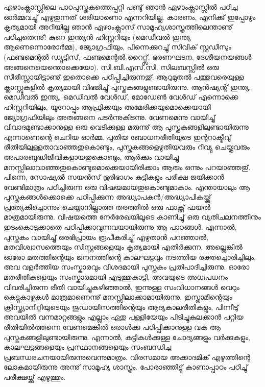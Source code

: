 ﻿
\vskip 2pt

ഏഴാംക്ലാസ്സിലെ പാഠപുസ്തകത്തെപ്പറ്റി പണ്ടു് ഞാന്‍ ഏഴാംക്ലാസ്സില്‍ പഠിച്ച ഓര്‍മ്മവച്ചു് എഴുതുന്നത് ശരിയാണൊ എന്നറിയില്ല. കാരണം,
എനിക്കു് ഇപ്പോഴും കൃത്യമായി അറിയില്ല ഞാന്‍ ഏഴാംക്ലാസ് സാമൂഹ്യശാസ്ത്രത്തിലെന്താണു് പഠിച്ചതെന്നു്! കുറെ ഇന്ത്യന്‍ ഹിസ്റ്ററിയും 
(മെഡീവല്‍ ഇന്ത്യ ആണെന്നൊരോര്‍മ്മ), ജ്യോഗ്രഫിയും, പിന്നെക്കുറച്ചു് സിവിക് സ്റ്റഡീസും (ഫണ്ടമെന്റല്‍ ഡ്യൂട്ടിസ്, ഫണ്ടമെന്റല്‍ റൈറ്റ്സ്, 
ഭരണഘടന, ദേശീയനയങ്ങള്‍ അങ്ങനെയെന്തൊക്കെയോ). സി.ബി.എസ്.സി. സിലബസ്സില്‍ ഒരു സീരീസ്സായിട്ടാണു് ഇതൊക്കെ പഠിപ്പിച്ചിരുന്നതു്. 
ആറുമുതല്‍ പത്തുവരെയുള്ള ക്ലാസ്സുകളില്‍ കൃത്യമായി വിഭജിച്ചു് പുസ്തകങ്ങളുണ്ടായിരുന്നു. ആന്‍ഷ്യന്റ് ഇന്ത്യ, മെഡീവല്‍ ഇന്ത്യ, മെഡീവല്‍ വേള്‍ഡ്, 
മോഡേണ്‍ വേള്‍ഡ് എന്നൊക്കെ ഹിസ്റ്ററിയിലും, യൂറോപ്പും ആഫ്രിക്കയും അമേരിക്കയുമൊക്കെയായി ജ്യോഗ്രഫിയിലും അതങ്ങനെ പടര്‍ന്നുകിടന്നു. 
വേണമെന്നു വായിച്ചു് വിവാദമുണ്ടാക്കാനുള്ള ഒരു വെടിക്കുള്ള മരുന്നു് ആ പുസ്തകങ്ങളിലുണ്ടായിരുന്നു എന്നാണെന്റെ ചെറിയ ഓര്‍മ്മ. പുതിയ ബോധനരീതിയുടെ ഇന്ററാക്ടീവു് രീതിയിലുള്ളതാവാഞ്ഞതുകൊണ്ടും, പുസ്തകങ്ങളെഴുതിയവരും റിവ്യു ചെയ്തവരും അപാരബുദ്ധിജീവികളായതുകൊണ്ടും, ആര്‍ക്കും വായിച്ചു മനസ്സിലാവാഞ്ഞതുകൊണ്ടുമൊക്കെയായിരിക്കാം ആരും ഒന്നും പറയാഞ്ഞതു്. പിന്നെ, സോഷ്യല്‍ സയന്‍സ് ഭൂരിഭാഗം കുട്ടികളും പരീക്ഷ ജയിക്കാന്‍ വേണ്ടിമാത്രം പഠിച്ചിരുന്ന ഒരു വിഷയമായതുകൊണ്ടുമാകാം. എന്തായാലും ആ പുസ്തകങ്ങള്‍ക്കൊക്കെ പഠിപ്പിക്കുന്ന അദ്ധ്യാപകന്‍/അദ്ധ്യാപികയ്ക്കു് പ്രത്യേകിച്ചൊന്നും ചെയ്യാനില്ലാത്ത തരത്തില്‍ 
ഒരു ഫാക്റ്റ് ഫയല്‍ മാത്രമായിരുന്നു. വിഷയത്തെ നേര്‍രേഖയിലൂടെ കാണിച്ചു് ഒരു വ്യതിചലനത്തിനും ഇടംകൊടുക്കാതെ 
പഠിപ്പിക്കാവുന്നവയായിരുന്നു ആ പാഠങ്ങള്‍. എന്നാല്‍, പുസ്തകം വായിച്ചു് ഒരഭിപ്രായം രൂപീകരിച്ചു് എഴുതാന്‍ പറഞ്ഞാല്‍, മതവിശ്വാസത്തെയും സിസ്റ്റങ്ങളെയും കൃത്യമായി എതിര്‍ക്കുന്ന, അല്ലെങ്കില്‍ ഓരോ മതത്തിന്റെയും ജനനത്തിന്റെ കാലഘട്ടവും നടത്തിയ രക്തച്ചൊരിച്ചിലും, അവ വളര്‍ത്തിയ സംസ്കാരവും വിശദമായി പുസ്തകം പ്രതിപാദിച്ചിരുന്നു. ഓരോ മതരീതികളെയും സംസ്കാരമായി എടുത്തുകാട്ടി, അവയുടെ അധഃപധനം വിവരിച്ചിരുന്ന രീതി വായിച്ചുകഴിഞ്ഞാല്‍, ഇന്നുള്ള സംവിധാനങ്ങള്‍ വെറും കെട്ടുകാഴ്ചകള്‍ മാത്രമാണെന്നു് മനസ്സിലാക്കാമായിരുന്നു. ഇസ്ലാമിന്റെയും ക്രിസ്ത്യാനിറ്റിയുടെയും ജുഡായിസത്തിന്റെയും ആദ്യകാലരീതികളും, പിന്നീടു് അവയില്‍ വന്നമാറ്റങ്ങളും എല്ലാം ഏതു പള്ളിയേയും പിടിച്ചുകുലക്കാന്‍ പറ്റിയ രീതിയില്‍ത്തന്നെ വേണമെങ്കില്‍ ഒരാള്‍ക്കു പഠിപ്പിക്കാനുള്ള വക ആ പുസ്തകങ്ങളിലുണ്ടായിരുന്നു. എന്നാല്‍, കുട്ടികള്‍ക്കുള്ള ചോദ്യങ്ങളും വര്‍ക്കുകളും, കാലഘട്ടങ്ങളെയും പ്രസ്ഥാനങ്ങളെയും സംബന്ധിച്ച പ്രബന്ധരചനയായിരുന്നുവെന്നുമാത്രം. 
വിരസമായ അക്കാദമിക് എഴുത്തിന്റെ ലോകമായിരുന്നു അന്നു് സാമൂഹ്യ ശാസ്ത്രം. പോരാഞ്ഞിട്ടു് കാണാപ്പാഠം പഠിച്ചു് പരീക്ഷയ്ക്കു് എഴുത്തും.

